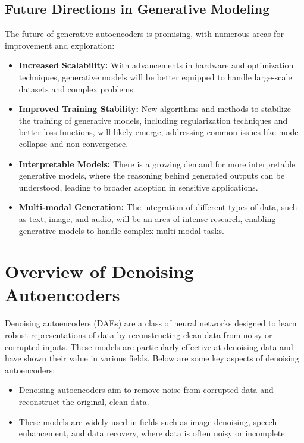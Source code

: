 \documentclass[a4paper,12pt]{article}
\begin{document}
\subsection{Future Directions in Generative Modeling}
The future of generative autoencoders is promising, with numerous areas for improvement and exploration:
\begin{itemize}
    \item \textbf{Increased Scalability:} With advancements in hardware and optimization techniques, generative models will be better equipped to handle large-scale datasets and complex problems.
    \item \textbf{Improved Training Stability:} New algorithms and methods to stabilize the training of generative models, including regularization techniques and better loss functions, will likely emerge, addressing common issues like mode collapse and non-convergence.
    \item \textbf{Interpretable Models:} There is a growing demand for more interpretable generative models, where the reasoning behind generated outputs can be understood, leading to broader adoption in sensitive applications.
    \item \textbf{Multi-modal Generation:} The integration of different types of data, such as text, image, and audio, will be an area of intense research, enabling generative models to handle complex multi-modal tasks.
\end{itemize}



\section{Overview of Denoising Autoencoders}

Denoising autoencoders (DAEs) are a class of neural networks designed to learn robust representations of data by reconstructing clean data from noisy or corrupted inputs. These models are particularly effective at denoising data and have shown their value in various fields. Below are some key aspects of denoising autoencoders:

\begin{itemize}
    \item Denoising autoencoders aim to remove noise from corrupted data and reconstruct the original, clean data.
    \item These models are widely used in fields such as image denoising, speech enhancement, and data recovery, where data is often noisy or incomplete.
\end{itemize}
\end{document}

